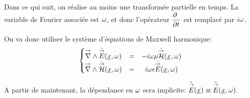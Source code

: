Dans ce qui suit, on réalise au moins une transformée partielle en temps. La variable de Fourier associée est $\w$, et donc l'opérateur $\ddr{t}{~}$ est remplacé par $i\w$.


On va donc utiliser le système d'équations de Maxwell harmonique:
\begin{equation}
    \left\lbrace 
    \begin{matrix}
    \vrot \hat \vE(\v{x},\w)  &=& -i \omega \mu \hat \vH(\v{x},\w)  \\
    \vrot \hat \vH(\v{x},\w)  &=& i \omega \eps \hat \vE(\v{x},\w) 
    \end{matrix}
    \right.
    \label{eq:imp_fourier:intro:maxwell_harmonique}
\end{equation}

A partir de maintenant, la dépendance en $\w$ sera implicite: $\hat \vE(\v x) \equiv \hat \vE (\v x, \w)$.